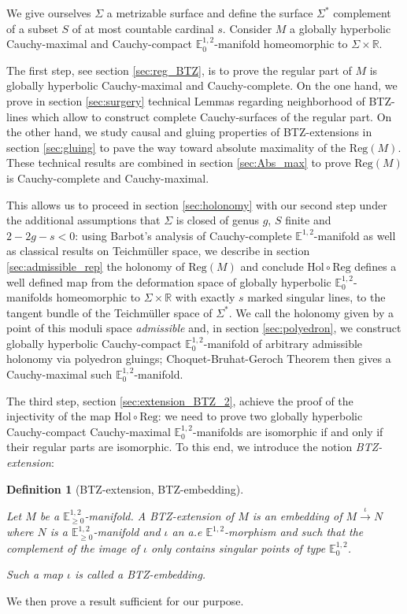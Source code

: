 \documentclass[a4paper,12pt]{article}
\def\RR{\mathbb{R}}
\newcommand{\mass}[1]{{\mathbb E}^{1,2}_{#1}}
\def\Reg{\mathrm{Reg}}
\def\reg{\Reg}
\newtheorem{defou}[lemou]{Definition}    %
\begin{document}
We give ourselves $\Sigma$ a metrizable surface and define the surface $\Sigma^*$ complement of a subset $S$ of at most countable cardinal $s$. 
Consider $M$ a globally hyperbolic Cauchy-maximal and Cauchy-compact $\mass{0}$-manifold homeomorphic to $\Sigma\times \RR$. 

The first step, see section \ref{sec:reg_BTZ}, is to prove the regular part of $M$ is globally hyperbolic Cauchy-maximal and Cauchy-complete.  On the one hand, we prove in section \ref{sec:surgery} technical Lemmas regarding neighborhood of BTZ-lines which allow to construct complete Cauchy-surfaces of the regular part.  On the other hand, we study causal and gluing properties of BTZ-extensions in section \ref{sec:gluing} to pave the way toward absolute maximality of the $\reg(M)$. These technical results are combined in section \ref{sec:Abs_max}  to prove $\reg(M)$ is Cauchy-complete and Cauchy-maximal. 

This allows us to proceed in section \ref{sec:holonomy} with our second step under the additional assumptions that $\Sigma$ is closed of genus $g$, $S$ finite and $2-2g-s<0$: using Barbot's analysis of Cauchy-complete $\mass{}$-manifold as well as classical results on Teichmüller space, we describe in section \ref{sec:admissible_rep} the holonomy of $\reg(M)$ and conclude $\mathrm{Hol}\circ \reg$ defines a well defined map from the deformation space of globally hyperbolic $\mass{0}$-manifolds homeomorphic to  $\Sigma\times \RR$ with exactly $s$ marked singular lines, to the tangent bundle of the Teichmüller space  of $\Sigma^*$.
We call the holonomy given by a point of this moduli space  {\it admissible} and, in section \ref{sec:polyedron}, we construct globally hyperbolic Cauchy-compact $\mass{0}$-manifold of arbitrary admissible holonomy via polyedron gluings; Choquet-Bruhat-Geroch Theorem then gives a Cauchy-maximal such  $\mass{0}$-manifold.

The third step, section \ref{sec:extension_BTZ_2}, achieve the proof of the injectivity of the map $\mathrm{Hol} \circ \reg$: we need to prove  two globally hyperbolic Cauchy-compact Cauchy-maximal $\mass{0}$-manifolds are isomorphic if and only if their regular parts are isomorphic. 
To this end, we introduce the notion {\it BTZ-extension}:

\begin{defou}[BTZ-extension, BTZ-embedding]\

Let $M$ be a $\mass{\geq 0}$-mani\-fold. A  BTZ-extension of  $M$ is an embedding of $M\xrightarrow{\iota} N$ where $N$ is a $\mass{\geq 0}$-manifold and $\iota$ an a.e $\mass{}$-morphism and such that the complement of the image of $\iota$ only contains singular points of type $\mass{0}$.

Such a map $\iota$ is called a BTZ-embedding.
\end{defou}      
 We then prove a result sufficient for our purpose.
 
\end{document}
